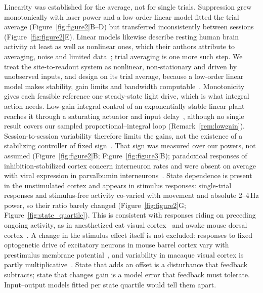 Linearity was established for the average, not for single trials. Suppression grew monotonically with laser power and a low-order linear model fitted the trial average (Figure~\ref{fig:figure2}B--D) but transferred inconsistently between sessions (Figure~\ref{fig:figure2}E). Linear models likewise describe resting human brain activity at least as well as nonlinear ones, which their authors attribute to averaging, noise and limited data~\citep{Nozari2024}; trial averaging is one more such step. We treat the site-to-readout system as nonlinear, non-stationary and driven by unobserved inputs, and design on its trial average, because a low-order linear model makes stability, gain limits and bandwidth computable~\citep{astrom2008feedback}. Monotonicity gives each feasible reference one steady-state light drive, which is what integral action needs. Low-gain integral control of an exponentially stable linear plant reaches it through a saturating actuator and input delay~\citep{logemann2000absolute}, although no single result covers our sampled proportional--integral loop (Remark~\ref{rem:lowgain}). Session-to-session variability therefore limits the gains, not the existence of a stabilizing controller of fixed sign~\citep{morari1985robust}. That sign was measured over our powers, not assumed (Figure~\ref{fig:figure2}B; Figure~\ref{fig:figure3}B); paradoxical responses of inhibition-stabilized cortex concern interneuron rates and were absent on average with viral expression in parvalbumin interneurons~\citep{sanzeni2020inhibition}. State dependence is present in the unstimulated cortex and appears in stimulus responses: single-trial responses and stimulus-free activity co-varied with movement and absolute 2--4\,Hz power, so their ratio barely changed (Figure~\ref{fig:figure2}G; Figure~\ref{fig:state_quartile}). This is consistent with responses riding on preceding ongoing activity, as in anesthetized cat visual cortex~\citep{Arieli1996} and awake mouse dorsal cortex~\citep{Shimaoka2019}. A change in the stimulus effect itself is not excluded: responses to fixed optogenetic drive of excitatory neurons in mouse barrel cortex vary with prestimulus membrane potential~\citep{Mateo2011}, and variability in macaque visual cortex is partly multiplicative~\citep{Goris2014}. State that adds an offset is a disturbance that feedback subtracts; state that changes gain is a model error that feedback must tolerate. Input--output models fitted per state quartile would tell them apart.


